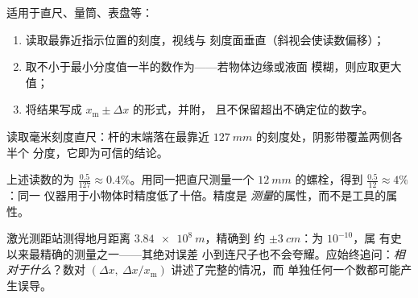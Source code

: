 \begin{method}[刻度仪器的读数]\label{met:g10:orders-of-magnitude:reading}
适用于直尺、量筒、表盘等：
\begin{enumerate}
  \item 读取最靠近指示位置的刻度，视线与
        刻度面垂直（斜视会使读数偏移）；
  \item 取不小于最小分度值一半的数作为——若物体边缘或液面
        模糊，则应取更大值；
  \item 将结果写成 $x_{\text{m}} \pm \Delta x$ 的形式，并附，
        且不保留超出不确定位的数字。
\end{enumerate}
\end{method}

\begin{omfigure}

{\small 读取毫米刻度直尺：杆的末端落在最靠近
$\qty{127}{mm}$ 的刻度处，阴影带覆盖两侧各半个
分度，它即为可信的结论。}
\end{omfigure}

\begin{example}[相对精度]\label{ex:g10:orders-of-magnitude:reading}
上述读数的为
$\frac{0.5}{127} \approx 0.4\%$。用同一把直尺测量一个
$\qty{12}{mm}$ 的螺栓，得到 $\frac{0.5}{12} \approx 4\%$：同一
仪器用于小物体时精度低了十倍。精度是
\emph{测量}的属性，而不是工具的属性。
\end{example}

\begin{remark}\label{rem:g10:orders-of-magnitude:precision}
激光测距站测得地月距离 $\qty{3.84e8}{m}$，精确到
约 $\pm\qty{3}{cm}$：为 $10^{-10}$，属
有史以来最精确的测量之一——其绝对误差
小到连尺子也不会夸耀。应始终追问：\emph{相对于什么}？数对
$(\Delta x,\ \Delta x / x_{\text{m}})$ 讲述了完整的情况，而
单独任何一个数都可能产生误导。
\end{remark}

